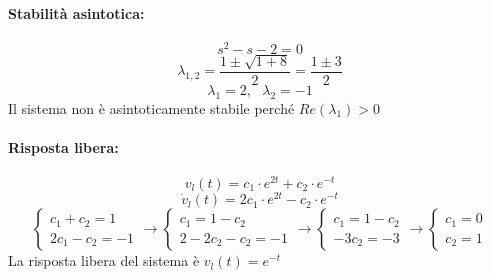 \documentclass[a4paper]{article}
\begin{document}
	\paragraph{Stabilità asintotica:}
	\[ s^2 - s - 2 = 0 \]
	\[ \lambda_{1,2} = \frac{1 \pm \sqrt{1 + 8}}{2} = \frac{1 \pm 3}{2}\]
	\[ \lambda_1 = 2, \text{ } \lambda_2 = -1 \]
	Il sistema non è asintoticamente stabile perché $Re(\lambda_1)>0$
	
	\paragraph{Risposta libera:}
	\[ v_l(t) = c_1 \cdot e^{2t} + c_2 \cdot e^{-t} \]
	\[ \dot{v}_l(t) = 2c_1 \cdot e^{2t} - c_2 \cdot e^{-t} \]
	\[
	\begin{cases}
		c_1 + c_2 = 1 \\
		2c_1 - c_2 = -1
	\end{cases}
	\longrightarrow
	\begin{cases}
		c_1 = 1 - c_2 \\
		2 - 2c_2 - c_2 = -1
	\end{cases}
	\longrightarrow
	\begin{cases}
		c_1 = 1 - c_2 \\
		-3 c_2 = -3
	\end{cases}
	\longrightarrow
	\begin{cases}
		c_1 = 0 \\
		c_2 = 1
	\end{cases}
	\]
	La risposta libera del sistema è $v_l(t) = e^{-t}$
	
\end{document}
